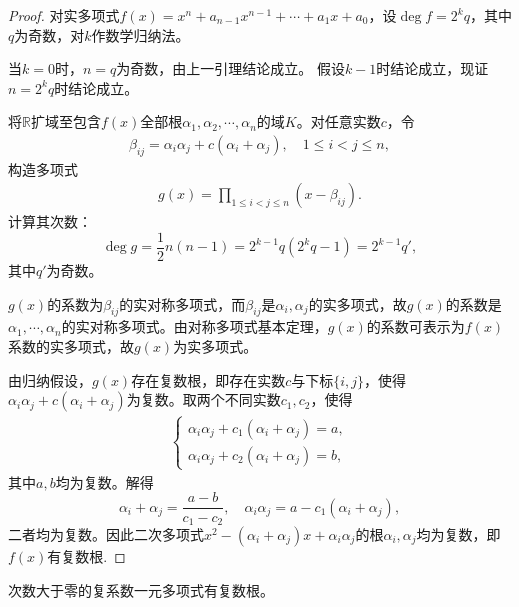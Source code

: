 \documentclass[../../main.tex]{subfiles}%
\begin{document}
\begin{proof}

对实多项式$f(x)=x^n+a_{n-1}x^{n-1}+\cdots+a_1x+a_0$，设$\deg f=2^k q$，其中$q$为奇数，对$k$作数学归纳法。

当$k=0$时，$n=q$为奇数，由上一引理结论成立。
假设$k-1$时结论成立，现证$n=2^k q$时结论成立。

将$\mathbb{R}$扩域至包含$f(x)$全部根$\alpha_1,\alpha_2,\cdots,\alpha_n$的域$K$。对任意实数$c$，令
\begin{align}
\beta_{ij}=\alpha_i\alpha_j+c(\alpha_i+\alpha_j),\quad 1\leqslant i<j\leqslant n,\label{eq:beta-def}
\end{align}
构造多项式
\begin{align}
g(x)=\prod\limits_{1\leqslant i<j\leqslant n}(x-\beta_{ij}).\label{eq:g-poly}
\end{align}
计算其次数：
$$\deg g=\frac12 n(n-1)=2^{k-1}q(2^k q-1)=2^{k-1}q',$$
其中$q'$为奇数。

$g(x)$的系数为$\beta_{ij}$的实对称多项式，而$\beta_{ij}$是$\alpha_i,\alpha_j$的实多项式，故$g(x)$的系数是$\alpha_1,\cdots,\alpha_n$的实对称多项式。由对称多项式基本定理，$g(x)$的系数可表示为$f(x)$系数的实多项式，故$g(x)$为实多项式。

由归纳假设，$g(x)$存在复数根，即存在实数$c$与下标$\{i,j\}$，使得$\alpha_i\alpha_j+c(\alpha_i+\alpha_j)$为复数。取两个不同实数$c_1,c_2$，使得
\begin{align}
\begin{cases}
\alpha_i\alpha_j+c_1(\alpha_i+\alpha_j)=a,\\
\alpha_i\alpha_j+c_2(\alpha_i+\alpha_j)=b,
\end{cases}\label{eq:sys-ab}
\end{align}
其中$a,b$均为复数。解得
$$\alpha_i+\alpha_j=\frac{a-b}{c_1-c_2},\quad \alpha_i\alpha_j=a-c_1(\alpha_i+\alpha_j),$$
二者均为复数。因此二次多项式$x^2-(\alpha_i+\alpha_j)x+\alpha_i\alpha_j$的根$\alpha_i,\alpha_j$均为复数，即$f(x)$有复数根.

\end{proof}

\begin{theorem}
次数大于零的复系数一元多项式有复数根。
\end{theorem}
\end{document}

